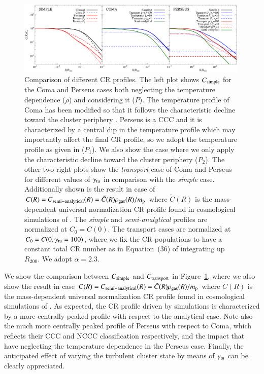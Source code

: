 \documentclass[traditabstract]{aa}
\begin{document}
\begin{appendix}
\begin{figure}[t]
\centering
\includegraphics[width=0.99\textwidth]{figures/CR_profiles_simple_comparison.eps}
\caption{Comparison of different CR profiles. The left plot shows $C_{\rm{simple}}$ for the Coma and Perseus cases both neglecting the temperature dependence ($\rho$) and considering it ($P$). The temperature profile of Coma has been modified so that it follows the characteristic decline toward the cluster periphery \citep{2007MNRAS.378..385P,2010MNRAS.409..449P}. Perseus is a CCC and it is characterized by a central dip in the temperature profile which may importantly affect the final CR profile, so we adopt the temperature profile as given in \citep{2004A&A...413...17P} ($P_{1}$). We also show the case where we only apply the characteristic decline toward the cluster periphery ($P_{2}$). The other two right plots show the \emph{transport} case of Coma and Perseus for different values of $\gamma_{\rm{tu}}$ in comparison with the \emph{simple} case. Additionally shown is the result in case of $C(R)=C_{\rm{semi-analytical}}(R)=\tilde{C}(R)\rho_{\rm{gas}}(R)/m_{\rm{p}}$ where $\tilde{C}(R)$ is the mass-dependent universal normalization CR profile found in cosmological simulations of \cite{2010MNRAS.409..449P}. The \emph{simple} and \emph{semi-analytical} profiles are normalized at $C_{0}=C(0)$. The transport cases are normalized at $C_{0}=C(0,\gamma_{\rm{tu}}=100)$, where we fix the CR populations to have a constant total CR number as in Equation~(36) of \cite{2011A&A...527A..99E} integrating up $R_{200}$. We adopt $\alpha=2.3$.}
\label{fig:simpleVStransport}
\end{figure}

We show the comparison between $C_{\rm{simple}}$ and $C_{\rm{transport}}$ in Figure~\ref{fig:simpleVStransport}, where we also show the result in case $C(R)=C_{\rm{semi-analytical}}(R)=\tilde{C}(R)\rho_{\rm{\rm{gas}}}(R)/m_{\rm{p}}$ where $\tilde{C}(R)$ is the mass-dependent universal normalization CR profile found in cosmological simulations of \cite{2010MNRAS.409..449P}. As expected, the CR profile driven by simulations is characterized by a more centrally peaked profile with respect to the analytical case. Note also the much more centrally peaked profile of Perseus with respect to Coma, which reflects their CCC and NCCC classification respectively, and the impact that have neglecting the temperature dependence in the Perseus case. Finally, the anticipated effect of varying the turbulent cluster state by means of $\gamma_{\rm{tu}}$ can be clearly appreciated.


\end{appendix}
\end{document}
